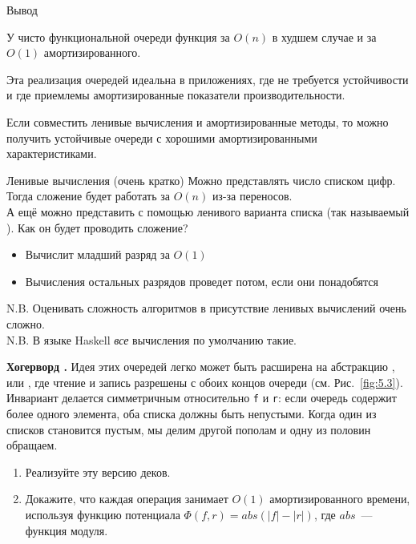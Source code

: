 \begin{frame}[fragile]{Вывод}

У чисто функциональной очереди функция  за $O(n)$ в худшем случае и за $O(1)$ амортизированного.\\

\begin{hint}
  Эта реализация очередей идеальна в приложениях, где не требуется
  устойчивости и где приемлемы амортизированные показатели
  производительности.
\end{hint}

Если совместить ленивые вычисления и амортизированные методы, то можно получить устойчивые очереди с хорошими амортизированными характеристиками.
\end{frame}

\begin{frame}[fragile]{Ленивые вычисления (очень кратко)}
Можно представлять число списком цифр. Тогда сложение будет работать за $O(n)$ из-за переносов.\\

А ещё можно представить с помощью ленивого варианта списка
(так называемый ). Как он будет проводить сложение?
\begin{itemize}
  \item Вычислит младший разряд за $O(1)$
  \item Вычисления остальных разрядов проведет потом, если они понадобятся
\end{itemize}\vspace{.5cm}

N.B. Оценивать сложность алгоритмов в присутствие ленивых вычислений очень сложно.\\

N.B. В языке Haskell \emph{все} вычисления по умолчанию такие.

\end{frame}


\ifanswers
\begin{frame}[fragile]{}
\begin{exercise}\label{ex:5.1}
  \textbf{Хогерворд \cite{Hoogerwoord1992}.}  Идея этих очередей легко
  может быть расширена на абстракцию , или , где чтение и запись разрешены с
  обоих концов очереди (см. Рис.~\ref{fig:5.3}). Инвариант делается
  симметричным относительно \lstinline!f! и \lstinline!r!: если
  очередь содержит более одного элемента, оба списка должны быть
  непустыми. Когда один из списков становится пустым, мы делим другой
  пополам и одну из половин обращаем.
  
  \begin{enumerate}
    \item Реализуйте эту версию деков.
    \item Докажите, что каждая операция занимает $O(1)$ амортизированного
    времени, используя функцию потенциала $\Phi(f,r) = abs(|f| -
    |r|)$, где $abs$~--- функция модуля.
  \end{enumerate}
\end{exercise}
\end{frame}
\fi

